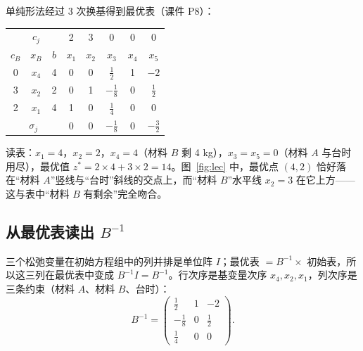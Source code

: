 单纯形法经过 3 次换基得到最优表（课件 P8）：

\begin{table}[!htbp]\centering
\small
\begin{tabular}{@{}ccc|ccccc@{}}
\toprule
& $c_j$ & & 2 & 3 & 0 & 0 & 0\\
$c_B$ & $x_B$ & $b$ & $x_1$ & $x_2$ & $x_3$ & $x_4$ & $x_5$\\\midrule
0 & $x_4$ & 4 & 0 & 0 & \cellcolor{formulablue}$\frac12$ & \cellcolor{formulablue}1 & \cellcolor{formulablue}$-2$\\
3 & $x_2$ & 2 & 0 & 1 & \cellcolor{formulablue}$-\frac18$ & \cellcolor{formulablue}0 & \cellcolor{formulablue}$\frac12$\\
2 & $x_1$ & 4 & 1 & 0 & \cellcolor{formulablue}$\frac14$ & \cellcolor{formulablue}0 & \cellcolor{formulablue}0\\\midrule
\multicolumn{3}{c|}{$\sigma_j$} & 0 & 0 & \cellcolor{shiftc!25}$-\frac18$ & \cellcolor{shiftc!25}0 & \cellcolor{shiftc!25}$-\frac32$\\\bottomrule
\end{tabular}\par\nopagebreak[4]
\label{tab:lec}
\end{table}

读表：$x_1=4$，$x_2=2$，$x_4=4$（材料 $B$ 剩 4 kg），$x_3=x_5=0$（材料 $A$ 与台时用尽），最优值 $z^*=2\times4+3\times2=14$。图~\ref{fig:lec} 中，最优点 $(4,2)$ 恰好落在“材料 $A$”竖线与“台时”斜线的交点上，而“材料 $B$”水平线 $x_2=3$ 在它上方——这与表中“材料 $B$ 有剩余”完全吻合。

\subsection{从最优表读出 $B^{-1}$}

\begin{theorembox}
三个松弛变量在初始方程组中的列并排是单位阵 $I$；最优表 $=B^{-1}\times$ 初始表，所以这三列在最优表中变成 $B^{-1}I=B^{-1}$。行次序是基变量次序 $x_4,x_2,x_1$，列次序是三条约束（材料 $A$、材料 $B$、台时）：
\[
B^{-1}=\begin{pmatrix}\frac12&1&-2\\[2pt]-\frac18&0&\frac12\\[2pt]\frac14&0&0\end{pmatrix}.
\]
\end{theorembox}

